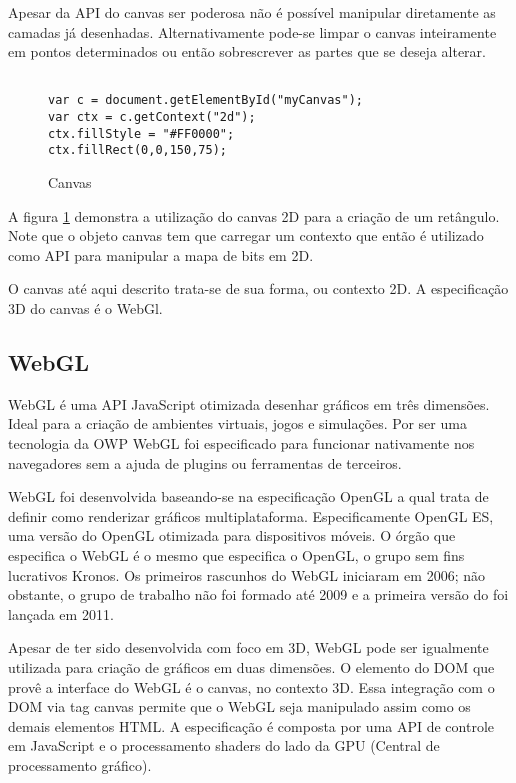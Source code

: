 Apesar da API do canvas ser poderosa não é possível manipular
diretamente as camadas já desenhadas. Alternativamente pode-se limpar
o canvas inteiramente em pontos determinados ou então sobrescrever as
partes que se deseja alterar.

\begin{figure}[H]
\centering
\begin{verbatim}

var c = document.getElementById("myCanvas");
var ctx = c.getContext("2d");
ctx.fillStyle = "#FF0000";
ctx.fillRect(0,0,150,75);

\end{verbatim}
\caption{Canvas}
\label{img:retangleOnCanvas}
\end{figure}

A figura \ref{img:retangleOnCanvas} demonstra a utilização do canvas 2D
para a criação de um retângulo. Note que o objeto canvas tem que carregar um
contexto que então é utilizado como API para manipular a mapa de bits em 2D.

O canvas até aqui descrito trata-se de sua forma, ou contexto 2D. A
especificação 3D do canvas é o WebGl.

\subsection{WebGL}

WebGL é uma API JavaScript otimizada desenhar gráficos em três
dimensões. Ideal para a criação de ambientes virtuais, jogos e
simulações. Por ser uma tecnologia da OWP WebGL foi especificado
para funcionar nativamente nos navegadores sem a ajuda de plugins ou
ferramentas de terceiros.

WebGL foi desenvolvida baseando-se na especificação OpenGL a
qual trata de definir como renderizar gráficos multiplataforma.
Especificamente OpenGL ES, uma versão do OpenGL otimizada para
dispositivos móveis. O órgão que especifica o WebGL é o mesmo que
especifica o OpenGL, o grupo sem fins lucrativos Kronos. Os primeiros
rascunhos do WebGL iniciaram em 2006; não obstante, o grupo de trabalho
não foi formado até 2009 e a primeira versão do foi lançada em 2011.

Apesar de ter sido desenvolvida com foco em 3D, WebGL pode
ser igualmente utilizada para criação de gráficos em duas
dimensões\autocite[p. 6]{3daps}. O elemento do DOM que provê a
interface do WebGL é o canvas, no contexto 3D. Essa integração com
o DOM via tag canvas permite que o WebGL seja manipulado assim como os
demais elementos HTML. A especificação é composta por uma API de
controle em JavaScript e o processamento shaders do lado da GPU (Central
de processamento gráfico).

